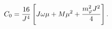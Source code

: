 \begin{equation}
C_0 = {16 \over J^4} \left [ J \omega \mu + M \mu^2
  + {{ m_\varphi^2 J^2} \over 4} \right ] .
\label{def-c0}
\end{equation}

